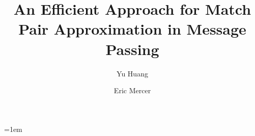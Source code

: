 \documentclass[conference]{llncs}
\begin{document}
\title{An Efficient Approach for Match Pair Approximation in Message Passing}

\author{Yu Huang \and Eric Mercer}

\maketitle
%
%
\emergencystretch=1em


\begin{abstract} 

\end{abstract}





%

%
%
%







\end{document}

